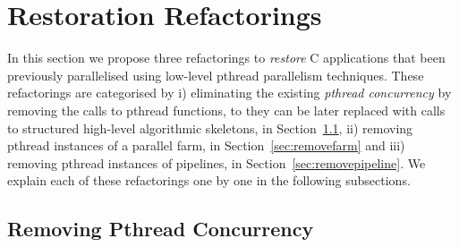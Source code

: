 \section{Restoration Refactorings} 

In this section we propose three refactorings to \emph{restore} C applications that been previously parallelised using low-level pthread parallelism techniques.
These refactorings are categorised by i) eliminating the existing \emph{pthread concurrency} by removing the calls to pthread functions, to they can be later replaced with calls to structured high-level algorithmic skeletons, in Section~\ref{sec:removepthread}, ii) removing pthread instances of a parallel farm, in Section~\ref{sec:removefarm} and iii) removing pthread instances of pipelines, in Section~\ref{sec:removepipeline}. We explain each of these refactorings one by one in the following subsections.

\subsection{Removing Pthread Concurrency} \label{sec:removepthread}




